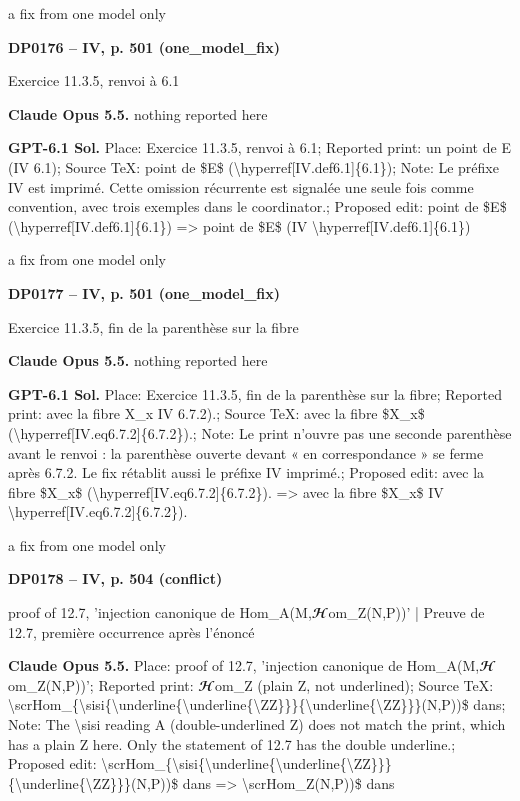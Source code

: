 a fix from one model only\par
\par\noindent\hypertarget{DP0176}{}\textbf{DP0176 -- IV, p. 501 (one\_model\_fix)}\par
Exercice 11.3.5, renvoi à 6.1\par
\textbf{Claude Opus 5.5.} nothing reported here\par
\textbf{GPT-6.1 Sol.} Place: Exercice 11.3.5, renvoi à 6.1; Reported print: un point de E (IV 6.1); Source TeX: point de \$E\$ (\textbackslash{}hyperref[IV.def6.1]\{6.1\}); Note: Le préfixe IV est imprimé. Cette omission récurrente est signalée une seule fois comme convention, avec trois exemples dans le coordinator.; Proposed edit: point de \$E\$ (\textbackslash{}hyperref[IV.def6.1]\{6.1\}) =\allowbreak > point de \$E\$ (IV \textbackslash{}hyperref[IV.def6.1]\{6.1\})\par
a fix from one model only\par
\par\noindent\hypertarget{DP0177}{}\textbf{DP0177 -- IV, p. 501 (one\_model\_fix)}\par
Exercice 11.3.5, fin de la parenthèse sur la fibre\par
\textbf{Claude Opus 5.5.} nothing reported here\par
\textbf{GPT-6.1 Sol.} Place: Exercice 11.3.5, fin de la parenthèse sur la fibre; Reported print: avec la fibre X\_x IV 6.7.2).; Source TeX: avec la fibre \$X\_x\$ (\textbackslash{}hyperref[IV.eq6.7.2]\{6.7.2\}).; Note: Le print n'ouvre pas une seconde parenthèse avant le renvoi : la parenthèse ouverte devant « en correspondance » se ferme après 6.7.2. Le fix rétablit aussi le préfixe IV imprimé.; Proposed edit: avec la fibre \$X\_x\$ (\textbackslash{}hyperref[IV.eq6.7.2]\{6.7.2\}). =\allowbreak > avec la fibre \$X\_x\$ IV \textbackslash{}hyperref[IV.eq6.7.2]\{6.7.2\}).\par
a fix from one model only\par
\par\noindent\hypertarget{DP0178}{}\textbf{DP0178 -- IV, p. 504 (conflict)}\par
proof of 12.7, 'injection canonique de Hom\_A(M,\ensuremath{𝓗}om\_Z(N,P))' | Preuve de 12.7, première occurrence après l'énoncé\par
\textbf{Claude Opus 5.5.} Place: proof of 12.7, 'injection canonique de Hom\_A(M,\ensuremath{𝓗}om\_Z(N,P))'; Reported print: \ensuremath{𝓗}om\_Z (plain Z, not underlined); Source TeX: \textbackslash{}scrHom\_\{\textbackslash{}sisi\{\textbackslash{}underline\{\textbackslash{}underline\{\textbackslash{}ZZ\}\}\}\{\textbackslash{}underline\{\textbackslash{}ZZ\}\}\}(N,P))\$ dans; Note: The \textbackslash{}sisi reading A (double-underlined Z) does not match the print, which has a plain Z here. Only the statement of 12.7 has the double underline.; Proposed edit: \textbackslash{}scrHom\_\{\textbackslash{}sisi\{\textbackslash{}underline\{\textbackslash{}underline\{\textbackslash{}ZZ\}\}\}\{\textbackslash{}underline\{\textbackslash{}ZZ\}\}\}(N,P))\$ dans =\allowbreak > \textbackslash{}scrHom\_Z(N,P))\$ dans\par
